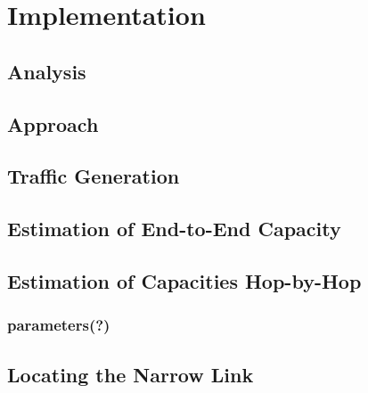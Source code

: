 \chapter{Implementation}

\section{Analysis}

\section{Approach}

\section{Traffic Generation}

\section{Estimation of End-to-End Capacity}

\section{Estimation of Capacities Hop-by-Hop}

\subsection*{parameters(?)}

\section{Locating the Narrow Link}

